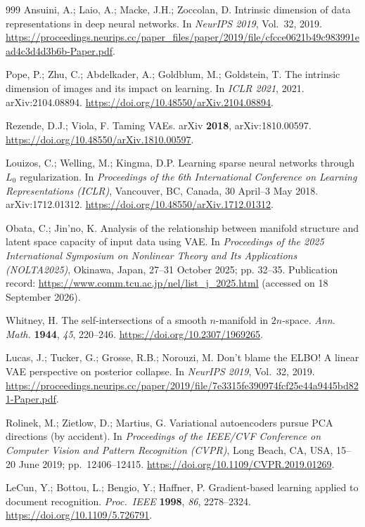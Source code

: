 \documentclass[make,article,submit,pdftex,moreauthors]{Definitions/mdpi}
\begin{document}
\begin{thebibliography}{999}
Ansuini, A.; Laio, A.; Macke, J.H.; Zoccolan, D.
Intrinsic dimension of data representations in deep neural networks.
In \textit{NeurIPS 2019}, Vol.~32, 2019. \url{https://proceedings.neurips.cc/paper_files/paper/2019/file/cfcce0621b49c983991ead4c3d4d3b6b-Paper.pdf}.

Pope, P.; Zhu, C.; Abdelkader, A.; Goldblum, M.; Goldstein, T.
The intrinsic dimension of images and its impact on learning.
In \textit{ICLR 2021}, 2021. arXiv:2104.08894. \url{https://doi.org/10.48550/arXiv.2104.08894}.

Rezende, D.J.; Viola, F.
Taming VAEs.
arXiv \textbf{2018}, arXiv:1810.00597.
\url{https://doi.org/10.48550/arXiv.1810.00597}.

Louizos, C.; Welling, M.; Kingma, D.P.
Learning sparse neural networks through $L_0$ regularization.
In \textit{Proceedings of the 6th International Conference on Learning
Representations (ICLR)}, Vancouver, BC, Canada, 30 April--3 May 2018.
arXiv:1712.01312. \url{https://doi.org/10.48550/arXiv.1712.01312}.

Obata, C.; Jin'no, K.
Analysis of the relationship between manifold structure and latent space
capacity of input data using VAE.
In \textit{Proceedings of the 2025 International Symposium on Nonlinear
Theory and Its Applications (NOLTA2025)}, Okinawa, Japan, 27--31 October
2025; pp. 32--35.
Publication record: \url{https://www.comm.tcu.ac.jp/nel/list_j_2025.html}
(accessed on 18 September 2026).

Whitney, H.
The self-intersections of a smooth $n$-manifold in $2n$-space.
\textit{Ann. Math.} \textbf{1944}, \textit{45}, 220--246.
\url{https://doi.org/10.2307/1969265}.

Lucas, J.; Tucker, G.; Grosse, R.B.; Norouzi, M.
Don't blame the ELBO! A linear VAE perspective on posterior collapse.
In \textit{NeurIPS 2019}, Vol.~32, 2019. \url{https://proceedings.neurips.cc/paper/2019/file/7e3315fe390974fcf25e44a9445bd821-Paper.pdf}.

Rolinek, M.; Zietlow, D.; Martius, G.
Variational autoencoders pursue PCA directions (by accident).
In \textit{Proceedings of the IEEE/CVF Conference on Computer Vision and
Pattern Recognition (CVPR)}, Long Beach, CA, USA, 15--20 June 2019;
pp.\ 12406--12415. \url{https://doi.org/10.1109/CVPR.2019.01269}.

LeCun, Y.; Bottou, L.; Bengio, Y.; Haffner, P.
Gradient-based learning applied to document recognition.
\textit{Proc.\ IEEE} \textbf{1998}, \textit{86}, 2278--2324.
\url{https://doi.org/10.1109/5.726791}.


\end{thebibliography}
\end{document}
